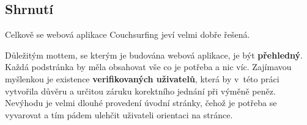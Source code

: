 
\newpage
\subsection{Shrnutí}
Celkově se webová aplikace Couchsurfing jeví velmi dobře řešená.

Důležitým mottem, se kterým je budována webová aplikace, je být \textbf{přehledný}. Každá podstránka by měla obsahovat vše co je potřeba a nic víc. Zajímavou myšlenkou je existence \textbf{verifikovaných uživatelů}, která by v~této práci vytvořila důvěru a určitou záruku korektního jednání při výměně peněz. Nevýhodu je velmi dlouhé provedení úvodní stránky, čehož je potřeba se vyvarovat a tím pádem ulehčit uživateli orientaci na stránce.